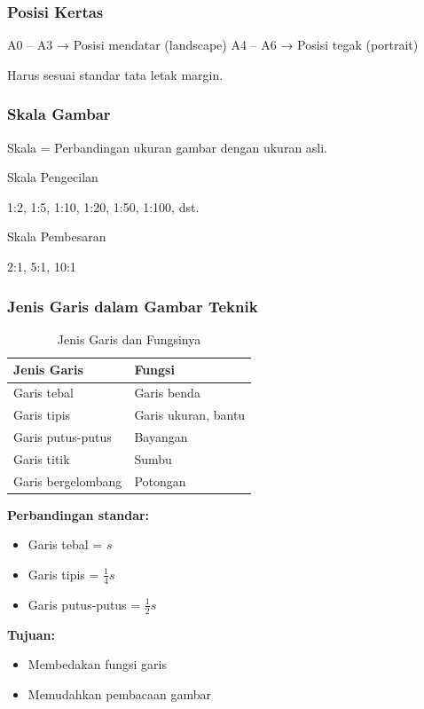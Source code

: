 \documentclass[../gbr_teknik.tex]{subfiles}
\begin{document}
\begin{frame}[t,mycolor=digiPH_leaf,mytitle=standard,dark]
	\frametitle{Posisi Kertas}

	A0 – A3 → Posisi mendatar (landscape)
	A4 – A6 → Posisi tegak (portrait)

	Harus sesuai standar tata letak margin.


\end{frame}


\begin{frame}[t,mycolor=digiPH_white,mytitle=standard,light]

	\frametitle{Skala Gambar}
	Skala = Perbandingan ukuran gambar dengan ukuran asli.

	Skala Pengecilan

	1:2, 1:5, 1:10, 1:20, 1:50, 1:100, dst.

	Skala Pembesaran

	2:1, 5:1, 10:1


\end{frame}

\begin{frame}[t,mycolor=digiPH_white,mytitle=standard,light]
	\frametitle{Jenis Garis dalam Gambar Teknik}

	\begin{table}[h]
		\centering
		\caption{Jenis Garis dan Fungsinya}
		\begin{tabular}{|l|l|}
			\hline
			Jenis Garis        & Fungsi              \\
			\hline
			Garis tebal        & Garis benda         \\
			Garis tipis        & Garis ukuran, bantu \\
			Garis putus-putus  & Bayangan            \\
			Garis titik        & Sumbu               \\
			Garis bergelombang & Potongan            \\
			\hline
		\end{tabular}
	\end{table}
\end{frame}

\begin{frame}[t,mycolor=digiPH_ocean,mytitle=center,dark]

	\textbf{Perbandingan standar:}
	\begin{itemize}
		\item Garis tebal = $s$
		\item Garis tipis = $\frac{1}{4}s$
		\item Garis putus-putus = $\frac{1}{2}s$
	\end{itemize}

	\textbf{Tujuan:}
	\begin{itemize}
		\item Membedakan fungsi garis
		\item Memudahkan pembacaan gambar
	\end{itemize}

\end{frame}
\end{document}
